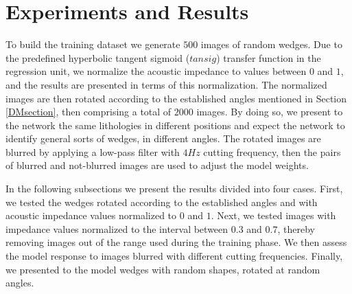 \documentclass[conference]{IEEEtran}
\begin{document}
\section{Experiments and Results}
To build the training dataset we generate $500$ images of random wedges.
Due to the predefined hyperbolic tangent sigmoid ($tansig$) transfer function in the regression unit,
we normalize the acoustic impedance to values between $0$ and $1$, and the results
are presented in terms of this normalization.
The normalized images are then rotated according to the established angles mentioned in Section \ref{DMsection},
then comprising a total of $2000$ images. By doing so, we present to
the network the same lithologies in different positions and expect the network
to identify general sorts of wedges, in different angles.
The rotated images are blurred by applying a low-pass filter with $4Hz$
cutting frequency, then the pairs of blurred and not-blurred images are used to
adjust the model weights.

In the following subsections we present the results divided into four cases.
First, we tested the wedges rotated according to the established angles and with acoustic impedance values normalized to $0$ and $1$. Next, we tested images with impedance values normalized to the interval between $0.3$ and $0.7$, thereby removing images out of the range used during the training phase.
We then assess the model response to images blurred with different cutting frequencies.
Finally, we presented to the model wedges with random shapes, rotated at random angles.
\end{document}
